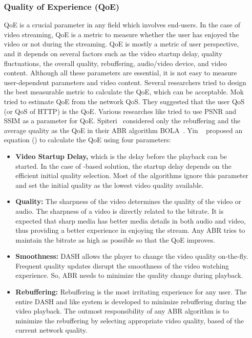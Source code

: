 \subsubsection{Quality of Experience (QoE)}
\ac{QoE} is a crucial parameter in any field which involves end-users. In the case of video streaming, \ac{QoE} is a metric to measure whether the user has enjoyed the video or not during the streaming. \ac{QoE} is mostly a metric of user perspective, and it depends on several factors such as the video startup delay, quality fluctuations, the overall quality, rebuffering, audio/video device, and video content. Although all these parameters are essential, it is not easy to measure user-dependent parameters and video content. Several researchers tried to design the best measurable metric to calculate the \ac{QoE}, which can be acceptable. Mok \etal \cite{5990550} tried to estimate \ac{QoE} from the network \ac{QoS}. They suggested that the user \ac{QoS} (or \ac{QoS} of \ac{HTTP}) is the \ac{QoE}. Various researches like \cite{10.1145/2155555.2155558,10.1145/3394171.3413512} tried to use \ac{PSNR} and \ac{SSIM} as a parameter for \ac{QoE}. Spiteri \etal\ considered only the rebuffering and the average quality as the \ac{QoE} in their \ac{ABR} algorithm BOLA~\cite{Spiteri2016}. Yin \etal~\cite{yin2015control} proposed an equation (\eqn{\ref{eqn:QoE}}) to calculate the \ac{QoE} using four parameters:
\begin{itemize}
	\item {\bf Video Startup Delay,} which is the delay before the playback can be started. In the case of -based solution, the startup delay depends on the efficient initial quality selection. Most of the  algorithms ignore this parameter and set the initial quality as the lowest video quality available.
	\item {\bf Quality:} The sharpness of the video determines the quality of the video or audio. The sharpness of a video is directly related to the bitrate. It is expected that sharp media has better media details in both audio and video, thus providing a better experience in enjoying the stream. Any \ac{ABR} tries to maintain the bitrate as high as possible so that the \ac{QoE} improves.
	\item {\bf Smoothness:} \ac{DASH} allows the player to change the video quality on-the-fly. Frequent quality updates disrupt the smoothness of the video watching experience. So, \ac{ABR} needs to minimize the quality change during playback.
	\item {\bf Rebuffering:} Rebuffering is the most irritating experience for any user. The entire \ac{DASH} and  like system is developed to minimize rebuffering during the video playback. The outmost responsibility of any \ac{ABR} algorithm is to minimize the rebuffering by selecting appropriate video quality, based of the current network quality.
\end{itemize}
